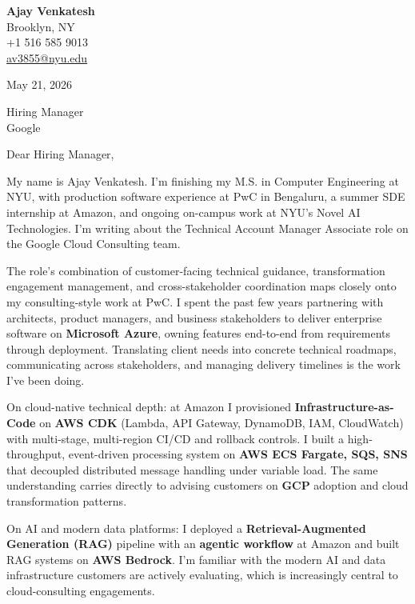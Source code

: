 \documentclass[letterpaper,11pt]{article}
\begin{document}
\begin{flushleft}
\textbf{\large Ajay Venkatesh} \\
Brooklyn, NY \\
+1 516 585 9013 \\
\href{mailto:av3855@nyu.edu}{av3855@nyu.edu}
\end{flushleft}
\vspace{10pt}
May 21, 2026
\vspace{6pt}

Hiring Manager \\
Google

\vspace{10pt}

Dear Hiring Manager,

My name is Ajay Venkatesh. I'm finishing my M.S. in Computer Engineering at NYU, with production software experience at PwC in Bengaluru, a summer SDE internship at Amazon, and ongoing on-campus work at NYU's Novel AI Technologies. I'm writing about the Technical Account Manager Associate role on the Google Cloud Consulting team.

The role's combination of customer-facing technical guidance, transformation engagement management, and cross-stakeholder coordination maps closely onto my consulting-style work at PwC. I spent the past few years partnering with architects, product managers, and business stakeholders to deliver enterprise software on \textbf{Microsoft Azure}, owning features end-to-end from requirements through deployment. Translating client needs into concrete technical roadmaps, communicating across stakeholders, and managing delivery timelines is the work I've been doing.

On cloud-native technical depth: at Amazon I provisioned \textbf{Infrastructure-as-Code} on \textbf{AWS CDK} (Lambda, API Gateway, DynamoDB, IAM, CloudWatch) with multi-stage, multi-region CI/CD and rollback controls. I built a high-throughput, event-driven processing system on \textbf{AWS ECS Fargate, SQS, SNS} that decoupled distributed message handling under variable load. The same understanding carries directly to advising customers on \textbf{GCP} adoption and cloud transformation patterns.

On AI and modern data platforms: I deployed a \textbf{Retrieval-Augmented Generation (RAG)} pipeline with an \textbf{agentic workflow} at Amazon and built RAG systems on \textbf{AWS Bedrock}. I'm familiar with the modern AI and data infrastructure customers are actively evaluating, which is increasingly central to cloud-consulting engagements.
\end{document}
